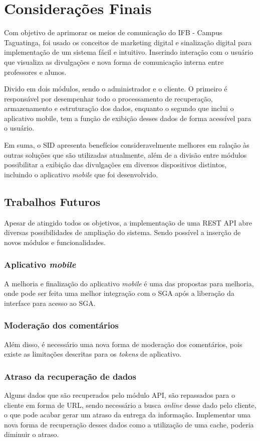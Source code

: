 \chapter[Considerações Finais]{Considerações Finais}
Com objetivo de aprimorar os meios de comunicação do IFB - Campus Taguatinga, foi usado os conceitos de marketing digital e sinalização digital para implementação de um sistema fácil e intuitivo. Inserindo interação com o usuário que visualiza as divulgações e nova forma de comunicação interna entre professores e alunos.  

Divido em dois módulos, sendo o administrador e o cliente. O primeiro é responsável por desempenhar todo o processamento de recuperação, armazenamento e estruturação dos dados, enquanto o segundo que inclui o aplicativo mobile, tem a função de exibição desses dados de forma acessível para o usuário.  

Em suma, o SID apresenta benefícios consideravelmente melhores em ralação às outras soluções que são utilizadas atualmente, além de a divisão entre módulos possibilitar a exibição das divulgações em diversos dispositivos distintos, incluindo o aplicativo \textit{mobile} que foi desenvolvido.

\section{Trabalhos Futuros}
Apesar de atingido todos os objetivos, a implementação de uma REST API abre diversas possibilidades de ampliação do sistema. Sendo possível a inserção de novos módulos e funcionalidades.

\subsection{Aplicativo \textit{mobile}}
A melhoria e finalização do aplicativo \textit{mobile} é uma das propostas para melhoria, onde pode ser feita uma melhor integração com o SGA após a liberação da interface para acesso ao SGA.

\subsection{Moderação dos comentários}
Além disso, é necessário uma nova forma de moderação dos comentários, pois existe as limitações descritas para os \textit{tokens} de aplicativo.

\subsection{Atraso da recuperação de dados}
Alguns dados que são recuperados pelo módulo API, são repassados para o cliente em forma de URL, sendo necessário a busca \textit{online} desse dado pelo cliente, o que pode acabar gerar um atraso da entrega da informação. Implementar uma nova forma de recuperação desses dados como a utilização de uma cache, poderia diminuir o atraso. 